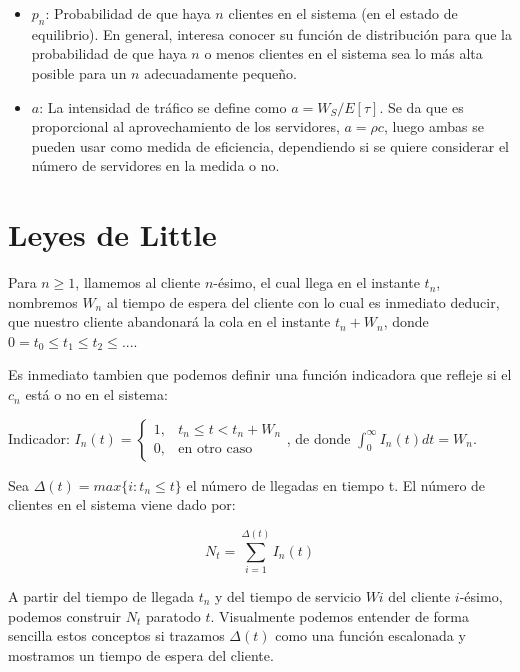 \documentclass[a4paper,10pt]{scrartcl}
\theoremstyle{definition}
\numberwithin{equation}{section}
\begin{document}
\begin{itemize}
\item $p_n$:
  Probabilidad de que haya $n$ clientes en el sistema (en el estado de equilibrio). En general, interesa 
  conocer su función de distribución para que la probabilidad de que haya $n$ o menos clientes en el sistema
  sea lo más alta posible para un $n$ adecuadamente pequeño.
\item $a$:
  La intensidad de tráfico se define como $a= W_S/E[\tau]$. Se da que es proporcional al aprovechamiento de
  los servidores, $a = \rho c$, luego ambas se pueden usar como medida de eficiencia, dependiendo si se 
  quiere considerar el número de servidores en la medida o no.
\end{itemize}

\section{Leyes de Little}
Para $n \geq 1$, llamemos al cliente $n$-ésimo, el cual llega en el instante $t_n$, nombremos $W_n$ al tiempo 
de espera del cliente con lo cual es inmediato deducir, que nuestro cliente abandonará la cola en el instante
$t_n + W_n$, donde $0 = t_0 \leq t_1 \leq t_2 \leq... $.

Es inmediato tambien que podemos definir una función indicadora que refleje si el $c_n$ está o no en el
sistema:

Indicador: $I_n(t) = \left\{\begin{array}{cc}
                      1, & t_n \leq t <t_n + W_n\\
                      0, & \textrm{en otro caso}
                     \end{array}\right.$, de donde  $\int_{0}^{\infty} I_n(t)dt=W_n$.

Sea $\Delta(t) = max \{i: t_n \leq t\}$ el número de llegadas en tiempo t. El número de clientes en el sistema
viene dado por:

\[N_t = \sum_{i=1}^{\Delta(t)} I_n(t)\]

A partir del tiempo de llegada ${t_n}$ y del tiempo de servicio ${W i}$ del cliente $i$-ésimo, podemos 
construir ${N_t}$ paratodo $t$. Visualmente podemos entender de forma sencilla estos conceptos si trazamos 
${\Delta (t)}$ como una función escalonada y mostramos un tiempo de espera del cliente.
\end{document}
